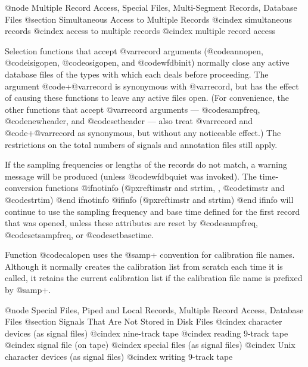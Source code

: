 {{{{{{{{{{{{{{@node     Multiple Record Access, Special Files, Multi-Segment Records, Database Files
@section Simultaneous Access to Multiple Records
@cindex simultaneous records
@cindex access to multiple records
@cindex multiple record access

Selection functions that accept @var{record} arguments (@code{annopen},
@code{isigopen}, @code{osigopen}, and @code{wfdbinit}) normally close any
active database files of the types with which each deals before
proceeding.  The argument @code{+}@var{record} is synonymous with
@var{record}, but has the effect of causing these functions to leave any
active files open.  (For convenience, the other functions that accept
@var{record} arguments --- @code{sampfreq}, @code{newheader}, and
@code{setheader} --- also treat @var{record} and @code{+}@var{record} as
synonymous, but without any noticeable effect.)  The restrictions on the
total numbers of signals and annotation files still apply.

If the sampling frequencies or lengths of the records do not match, a warning
message will be produced (unless @code{wfdbquiet} was invoked).  The
time-conversion functions
@ifnotinfo
(@pxref{timstr and strtim, , @code{timstr} and @code{strtim}})
@end ifnotinfo
@ifinfo
(@pxref{timstr and strtim})
@end ifinfo
will continue to use the sampling frequency and base
time defined for the first record that was opened, unless these
attributes are reset by @code{sampfreq}, @code{setsampfreq}, or
@code{setbasetime}.

Function @code{calopen} uses the @samp{+} convention for calibration
file names.  Although it normally creates the calibration list from
scratch each time it is called, it retains the current calibration list
if the calibration file name is prefixed by @samp{+}.

@node     Special Files, Piped and Local Records, Multiple Record Access, Database Files
@section Signals That Are Not Stored in Disk Files
@cindex character devices (as signal files)
@cindex nine-track tape
@cindex reading 9-track tape
@cindex signal file (on tape)
@cindex special files (as signal files)
@cindex Unix character devices (as signal files)
@cindex writing 9-track tape

}}}}}}}}}}}}}}
